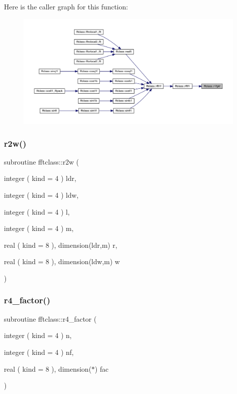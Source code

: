 Here is the caller graph for this function\+:\nopagebreak
\begin{figure}[H]
\begin{center}
\leavevmode
\includegraphics[width=350pt]{namespacefftclass_adb327056327448d0a605271d57091578_icgraph}
\end{center}
\end{figure}
\mbox{\label{namespacefftclass_a6d2b5609d651241869584e962d234756}} 
\subsubsection{\texorpdfstring{r2w()}{r2w()}}
{\footnotesize\ttfamily subroutine fftclass\+::r2w (\begin{DoxyParamCaption}\item[{integer ( kind = 4 )}]{ldr,  }\item[{integer ( kind = 4 )}]{ldw,  }\item[{integer ( kind = 4 )}]{l,  }\item[{integer ( kind = 4 )}]{m,  }\item[{real ( kind = 8 ), dimension(ldr,m)}]{r,  }\item[{real ( kind = 8 ), dimension(ldw,m)}]{w }\end{DoxyParamCaption})}

\mbox{\label{namespacefftclass_ad76d163c3f3aec3b5a3bbb3285498ffd}} 
\subsubsection{\texorpdfstring{r4\_factor()}{r4\_factor()}}
{\footnotesize\ttfamily subroutine fftclass\+::r4\+\_\+factor (\begin{DoxyParamCaption}\item[{integer ( kind = 4 )}]{n,  }\item[{integer ( kind = 4 )}]{nf,  }\item[{real ( kind = 8 ), dimension($\ast$)}]{fac }\end{DoxyParamCaption})}

